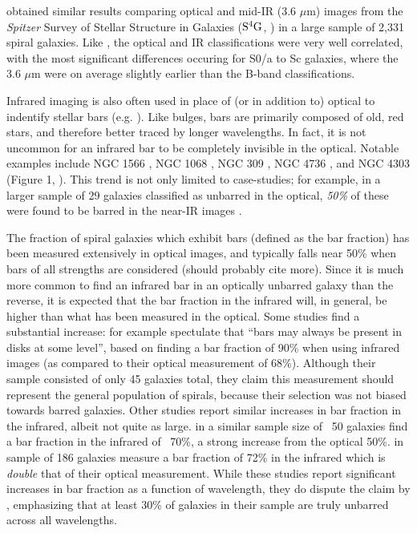 \citet{Buta2010} obtained similar results comparing optical and mid-IR (3.6 $\mu$m) images from the \textit{Spitzer} Survey of Stellar Structure in Galaxies ($\rm S^4G$, \citet{Sheth2010}) in a large sample of 2,331 spiral galaxies. Like \citet{Eskridge2002}, the optical and IR classifications were very well correlated, with the most significant differences occuring for S0/a to Sc galaxies, where the 3.6 $\mu$m were on average slightly earlier than the B-band classifications.

Infrared imaging is also often used in place of (or in addition to) optical to indentify stellar bars (e.g. \citet{Mulchaey1997,Knapen2000,Block2004,Sheth2008}). Like bulges, bars are primarily composed of old, red stars, and therefore better traced by longer wavelengths. In fact, it is not uncommon for an infrared bar to be completely invisible in the optical. Notable examples include NGC 1566 \citep{Hackwell1983}, NGC 1068 \citep{Thronson1989,Scoville1988}, NGC 309 \citep{Block1991}, NGC 4736 \citep{Block1994}, and NGC 4303 (Figure 1, \citet{Sheth2003}). This trend is not only limited to case-studies; for example, in a larger sample of 29 galaxies classified as unbarred in the optical, \emph{50\%} of these were found to be barred in the near-IR images \citep{Mulchaey1997}.

The fraction of spiral galaxies which exhibit bars (defined as the bar fraction) has been measured extensively in optical images, and typically falls near 50\% when bars of all strengths are considered \citep{Masters2010}(should probably cite more). Since it is much more common to find an infrared bar in an optically unbarred galaxy than the reverse, it is expected that the bar fraction in the infrared will, in general, be higher than what has been measured in the optical. Some studies find a substantial increase: \citet{Seigar1998} for example spectulate that ``bars may always be present in disks at some level'', based on finding a bar fraction of 90\% when using infrared images (as compared to their optical measurement of 68\%). Although their sample consisted of only 45 galaxies total, they claim this measurement should represent the general population of spirals, because their selection was not biased towards barred galaxies. Other studies report similar increases in bar fraction in the infrared, albeit not quite as large. \citet{Knapen2000} in a similar sample size of ~50 galaxies find a bar fraction in the infrared of ~70\%, a strong increase from the optical 50\%. \citet{Eskridge2000} in sample of 186 galaxies measure a bar fraction of 72\% in the infrared which is \emph{double} that of their optical measurement. While these studies report significant increases in bar fraction as a function of wavelength, they do dispute the claim by \citet{Seigar1998}, emphasizing that at least 30\% of galaxies in their sample are truly unbarred across all wavelengths.

